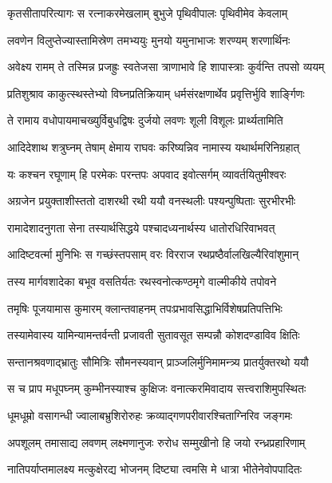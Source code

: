 
\twolineshloka
{कृतसीतापरित्यागः स रत्नाकरमेखलाम्}
{बुभुजे पृथिवीपालः पृथिवीमेव केवलाम्} %

\twolineshloka
{लवणेन विलुप्तेज्यास्तामिस्रेण तमभ्ययुः}
{मुनयो यमुनाभाजः शरण्यम् शरणार्थिनः} %

\twolineshloka
{अवेक्ष्य रामम् ते तस्मिन्न प्रजह्रुः स्वतेजसा}
{त्राणाभावे हि शापास्त्राः कुर्वन्ति तपसो व्ययम्} %

\twolineshloka
{प्रतिशुश्राव काकुत्स्थस्तेभ्यो विघ्नप्रतिक्रियाम्}
{धर्मसंरक्षणार्थेव प्रवृत्तिर्भुवि शार्ङ्गिणः} %

\twolineshloka
{ते रामाय वधोपायमाचख्युर्विबुधद्विषः}
{दुर्जयो लवणः शूली विशूलः प्रार्थ्यतामिति} %

\twolineshloka
{आदिदेशाथ शत्रुघ्नम् तेषाम् क्षेमाय राघवः}
{करिष्यन्निव नामास्य यथार्थमरिनिग्रहात्} %

\twolineshloka
{यः कश्चन रघूणाम् हि परमेकः परन्तपः}
{अपवाद इवोत्सर्गम् व्यावर्तयितुमीश्वरः} %

\twolineshloka
{अग्रजेन प्रयुक्ताशीस्ततो दाशरथी रथी}
{ययौ वनस्थलीः पश्यन्पुष्पिताः सुरभीरभीः} %

\twolineshloka
{रामादेशादनुगता सेना तस्यार्थसिद्धये}
{पश्चादध्यनार्थस्य धातोरधिरिवाभवत्} %

\twolineshloka
{आदिष्टवर्त्मा मुनिभिः स गच्छंस्तपसाम् वरः}
{विरराज रथप्रष्ठैर्वालखिल्यैरिवांशुमान्} %

\twolineshloka
{तस्य मार्गवशादेका बभूव वसतिर्यतः}
{रथस्वनोत्कण्ठमृगे वाल्मीकीये तपोवने} %

\twolineshloka
{तमृषिः पूजयामास कुमारम् क्लान्तवाहनम्}
{तपःप्रभावसिद्धाभिर्विशेषप्रतिपत्तिभिः} %

\twolineshloka
{तस्यामेवास्य यामिन्यामन्तर्वन्ती प्रजावती}
{सुतावसूत सम्पन्नौ कोशदण्डाविव क्षितिः} %

\twolineshloka
{सन्तानश्रवणाद्भ्रातुः सौमित्रिः सौमनस्यवान्}
{प्राञ्जलिर्मुनिमामन्त्र्य प्रातर्युक्तरथो ययौ} %

\twolineshloka
{स च प्राप मधूपघ्नम् कुम्भीनस्याश्च कुक्षिजः}
{वनात्करमिवादाय सत्त्वराशिमुपस्थितः} %

\twolineshloka
{धूमधूम्रो वसागन्धी ज्वालाबभ्रुशिरोरुहः}
{क्रव्याद्गणपरीवारश्चिताग्निरिव जङ्गमः} %

\twolineshloka
{अपशूलम् तमासाद्य लवणम् लक्ष्मणानुजः}
{रुरोध सम्मुखीनो हि जयो रन्ध्रप्रहारिणाम्} %

\twolineshloka
{नातिपर्याप्तमालक्ष्य मत्कुक्षेरद्य भोजनम्}
{दिष्ट्या त्वमसि मे धात्रा भीतेनेवोपपादितः} %

